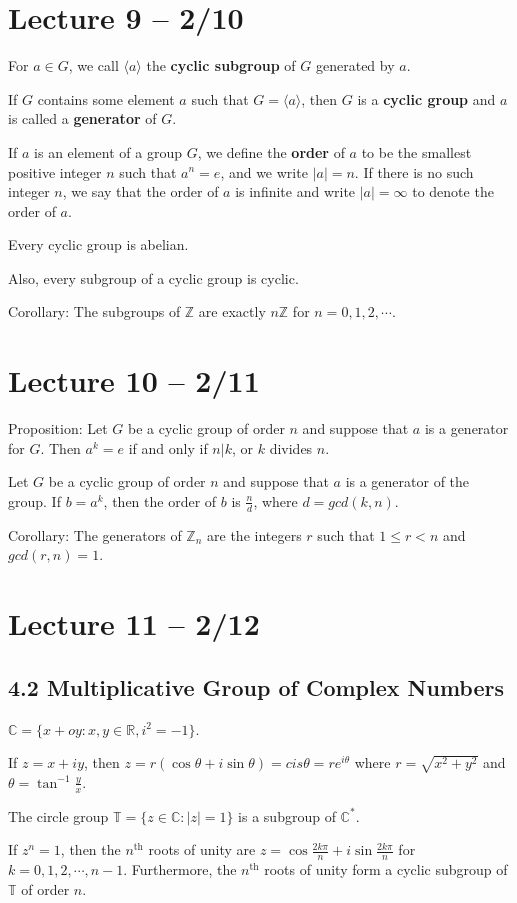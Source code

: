 \documentclass{article}
\newcommand{\R}{\mathbb{R}}
\newcommand{\Z}{\mathbb{Z}}
\newcommand{\C}{\mathbb{C}}
\newcommand{\T}{\mathbb{T}}
\begin{document}
\section{Lecture 9 -- 2/10}
For $a\in G$, we call $\langle a \rangle$ the \textbf{cyclic subgroup} of $G$ generated by $a$.

If $G$ contains some element $a$ such that $G=\langle a \rangle$, then $G$ is a \textbf{cyclic group} and $a$ is called a \textbf{generator} of $G$.

If $a$ is an element of a group $G$, we define the \textbf{order} of $a$ to be the smallest positive integer $n$ such that $a^n=e$, and we write $|a|=n$. If there is no such integer $n$, we say that the order of $a$ is infinite and write $|a|=\infty$ to denote the order of $a$.
\begin{theorem}
  Every cyclic group is abelian.

  Also, every subgroup of a cyclic group is cyclic.

  Corollary: The subgroups of $\Z$ are exactly $n\Z$ for $n=0,1,2,\cdots$.
\end{theorem}
\section{Lecture 10 -- 2/11}
Proposition: Let $G$ be a cyclic group of order $n$ and suppose that $a$ is a generator for $G$. Then $a^k = e$ if and only if $n|k$, or $k$ divides $n$.
\begin{theorem}
  Let $G$ be a cyclic group of order $n$ and suppose that $a$ is a generator of the group. If $b=a^k$, then the order of $b$ is $\frac{n}{d}$, where $d=gcd(k,n)$.

  Corollary: The generators of $\Z_n$ are the integers $r$ such that $1\leq r<n$ and $gcd(r,n)=1$.
\end{theorem}
\section{Lecture 11 -- 2/12}
\subsection{4.2 Multiplicative Group of Complex Numbers}
$\C=\{x+oy:x,y\in\R,i^2=-1\}.$

If $z=x+iy$, then $z=r(\cos{\theta}+i\sin{\theta})=cis\theta=re^{i\theta}$ where $r=\sqrt{x^2+y^2}$ and $\theta=\tan^{-1}{\frac{y}{x}}$.

The circle group $\T=\{z\in\C:|z|=1\}$ is a subgroup of $\C^*$.
\begin{theorem}
  If $z^n=1$, then the $n^{\text{th}}$ roots of unity are $z=\cos\frac{2k\pi}{n}+i\sin\frac{2k\pi}{n}$ for $k=0,1,2,\cdots,n-1$. Furthermore, the $n^{\text{th}}$ roots of unity form a cyclic subgroup of $\T$ of order $n$.
\end{theorem}
\end{document}
